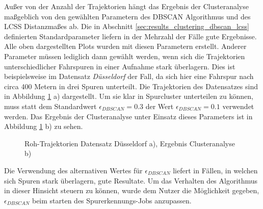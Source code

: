 Außer von der Anzahl der Trajektorien hängt das Ergebnis der Clusteranalyse maßgeblich von den gewählten
Parametern des DBSCAN Algorithmus und des LCSS Distanzmaßes ab. Die in Abschnitt \ref{sec:results_clustering_dbscan_lcss} definierten
Standardparameter liefern in der Mehrzahl der Fälle gute Ergebnisse. Alle oben dargestellten Plots
wurden mit diesen Parametern erstellt.
Anderer Parameter müssen lediglich dann gewählt werden, wenn sich die Trajektorien unterschiedlicher
Fahrspuren in einer Aufnahme stark überlagern.
Dies ist beispielsweise im Datensatz \textit{Düsseldorf} der Fall, da sich hier eine Fahrspur nach circa 400 Metern in drei Spuren unterteilt.
Die Trajektorien des Datensatzes sind in Abbildung \ref{fig:results_clusters_duesseldorf} a) dargestellt.
Um sie klar in Spurcluster unterteilen zu können, muss statt dem Standardwert
$\epsilon_{DBSCAN} = 0.3$ der Wert $\epsilon_{DBSCAN} = 0.1$ verwendet werden. Das Ergebnis der Clusteranalyse
unter Einsatz dieses Parameters ist in Abbildung \ref{fig:results_clusters_duesseldorf} b) zu sehen.

\begin{figure}[H]
    \centering
    \qquad \qquad
    \caption[Ergebnis Clusteranalyse Düsseldorf Datensatz]{Roh-Trajektorien Datensatz Düsseldorf a), Ergebnis Clusteranalyse b)}
    \label{fig:results_clusters_duesseldorf}
\end{figure}

Die Verwendung des alternativen Wertes für $\epsilon_{DBSCAN}$ liefert in Fällen, in welchen sich Spuren stark überlagern,
gute Resultate. Um das Verhalten des Algorithmus in dieser Hinsicht steuern zu können, wurde dem Nutzer die Möglichkeit
gegeben, $\epsilon_{DBSCAN}$ beim starten des Spurerkennungs-Jobs anzupassen.

